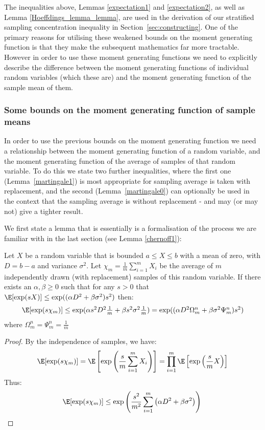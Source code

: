 The inequalities above, Lemmas \ref{expectation1} and \ref{expectation2}, as well as Lemma \ref{Hoeffdings_lemma_lemma}, are used in the derivation of our stratified sampling concentration inequality in Section~\ref{sec:constructing}. One of the primary reasons for utilising these weakened bounds on the moment generating function is that they make the subsequent mathematics far more tractable.
However in order to use these moment generating functions we need to explicitly describe the difference between the moment generating functions of individual random variables (which these are) and the moment generating function of the sample mean of them.

\subsubsection{Some bounds on the moment generating function of sample means}\label{sec:without_replacement}

In order to use the previous bounds on the moment generating function we need a relationship between the moment generating function of a random variable, and the moment generating function of the average of samples of that random variable.
To do this we state two further inequalities, where the first one (Lemma~\ref{martingale1}) is most appropriate for sampling average is taken with replacement, and the second (Lemma~\ref{martingale0}) can optionally be used in the context that the sampling average is without replacement - and may (or may not) give a tighter result.

We first state a lemma that is essentially is a formalisation of the process we are familiar with in the last section (see Lemma \ref{chernoff1}):

\begin{lemma}\label{martingale1}
Let $X$ be a random variable that is bounded $a\le X\le b$ with a mean of zero, with $D=b-a$ and variance $\sigma^2$.
Let $\chi_m = \frac{1}{m}\sum_{i=1}^mX_i$ be the average of $m$ independently drawn (with replacement) samples of this random variable.
If there exists an $\alpha, \beta \ge 0$ such that for any $s>0$ that $\E[\exp(sX)]\le\exp((\alpha D^2 +\beta \sigma^2) s^2)$ then:
$$\textstyle\E[\exp(s\chi_m)]\le\exp(\alpha s^2D^2\frac{1}{m} +\beta s^2\sigma^2 \frac{1}{m}) = \exp((\alpha D^2{\Omega}_m^n +\beta\sigma^2 {\Psi}_m^n)s^2)$$
where ${\Omega}_m^n = {\Psi}_m^n = \frac{1}{m}$
\end{lemma}
\begin{proof} 
By the independence of samples, we have:
\[\E[\exp(s\chi_m)]=\E\left[\exp\left(\frac{s}{m}\sum_{i=1}^mX_i\right)\right]=\prod_{i=1}^m\E\left[\exp\left(\frac{s}{m}X\right)\right]\] 
Thus:
\[\E[\exp(s\chi_m)] \le \exp\left(\frac{s^2}{m^2}\sum_{i=1}^m\left(\alpha D^2 +\beta \sigma^2\right) \right) \qedhere\]
\end{proof}


